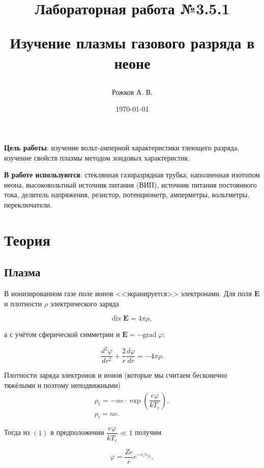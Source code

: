 \documentclass[a4paper, 12pt]{article}
\title{\begin{center}Лабораторная работа №3.5.1\end{center}
Изучение плазмы газового разряда в неоне}
\author{Рожков А. В.}
\date{\today}
\begin{document}
    \maketitle
    \newpage

    \textbf{Цель работы}: изучение вольт-амперной характеристики тлеющего разряда, изучение свойств плазмы методом зондовых характеристик.


    \textbf{В работе используются}: стеклянная газоразрядная трубка, наполненная изотопом неона, высоковольтный источник питания (ВИП), источник питания постоянного тока, делитель напряжения, резистор, потенциометр, амперметры, вольтметры, переключатели.
    \section{Теория}

        \subsection*{Плазма}

            В ионизированном газе поле ионов <<экранируется>> электронами. Для поля $\mathbf{E}$ и плотности $\rho$ электрического заряда

            $$
                \text{div}~\mathbf{E} = 4 \pi \rho,
            $$

            а с учётом сферической симметрии и $\mathbf{E} = -\text{grad}~\varphi$:

            \begin{equation}
                \dfrac{d^2 \varphi}{dr^2}+\dfrac{2}{r}\dfrac{d\varphi}{dr}=-4\pi \rho.
            \end{equation}

            Плотности заряда электронов и ионов (которые мы считаем бесконечно тяжёлыми и поэтому неподвижными)
            \begin{equation}
                \begin{array}{c}
                    \rho_e = -ne \cdot \exp\left(\dfrac{e\varphi}{kT_e}\right),\\
                    \rho_i = ne.
                \end{array}
            \end{equation}

            Тогда из $(1)$ в предположении $\dfrac{e\varphi}{kT_e} \ll 1$ получим

            \begin{equation}
                \varphi = \dfrac{Ze}{r}e^{-r/r_D},
            \end{equation}
\end{document}
